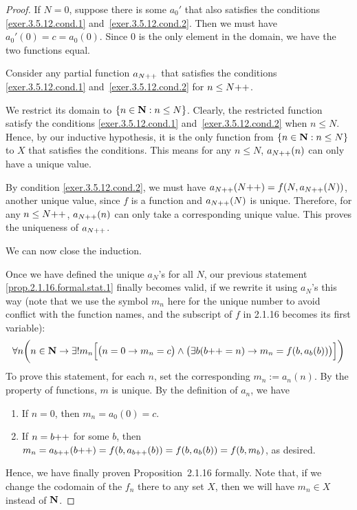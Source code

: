 \begin{proof}
	\mybcbox If $N = 0$, suppose there is some $a_0'$ that also satisfies the conditions \eqref{exer.3.5.12.cond.1} and~\eqref{exer.3.5.12.cond.2}. Then we must have $a_0'(0) = c = a_0(0)$. Since $0$ is the only element in the domain, we have the two functions equal.
	
	\myisbox Consider any partial function $a_{N{+}{+}}$ that satisfies the conditions \eqref{exer.3.5.12.cond.1} and~\eqref{exer.3.5.12.cond.2} for $n \le N{+}{+}$.
	
	We restrict its domain to $\{n \in \mathbf{N} : n \le N\}$. Clearly, the restricted function satisfy the conditions \eqref{exer.3.5.12.cond.1} and~\eqref{exer.3.5.12.cond.2} when $n \le N$. Hence, by our inductive hypothesis, it is the only function from $\{n \in \mathbf{N} : n \le N\}$ to $X$ that satisfies the conditions. This means for any $n \le N$, $a_{N{+}{+}}(n)$ can only have a unique value.
	
	By condition \eqref{exer.3.5.12.cond.2}, we must have $a_{N{+}{+}}(N{+}{+}) = f(N,a_{N{+}{+}}(N))$, another unique value, since $f$ is a function and $a_{N{+}{+}}(N)$ is unique. Therefore, for any $n \le N{+}{+}$, $a_{N{+}{+}}(n)$ can only take a corresponding unique value. This proves the uniqueness of $a_{N{+}{+}}$.
	
	We can now close the induction. \hfill \qedsymbol
	
	Once we have defined the unique $a_N$'s for all $N$, our previous statement \eqref{prop.2.1.16.formal.stat.1} finally becomes valid, if we rewrite it using $a_N$'s this way (note that we use the symbol $m_n$ here for the unique number to avoid conflict with the function names, and the subscript of $f$ in 2.1.16 becomes its first variable):
	\begin{equation}
		\forall n\bigg(n \in \mathbf{N} \to \exists!m_n\Bigl[\bigl(n = 0 \to m_n = c\bigr) \wedge \bigl(\exists b(b{+}{+} = n) \to m_n = f(b,a_b(b))\bigr)\Bigr]\bigg) \label{prop.2.1.16.formal.stat.2}
	\end{equation}
	To prove this statement, for each $n$, set the corresponding $m_n := a_n(n)$. By the property of functions, $m$ is unique. By the definition of $a_n$, we have 
	\begin{enumerate}
		\item If $n = 0$, then $m_n = a_0(0) = c$.
		\item If $n = b{+}{+}$ for some $b$, then $m_n = a_{b{+}{+}}(b{+}{+}) = f(b,a_{b{+}{+}}(b)) = f(b,a_{b}(b)) = f(b,m_b)$, as desired.
	\end{enumerate}
	Hence, we have finally proven Proposition~2.1.16 formally. Note that, if we change the codomain of the $f_n$ there to any set $X$, then we will have $m_n \in X$ instead of $\mathbf{N}$.
	

\end{proof}

